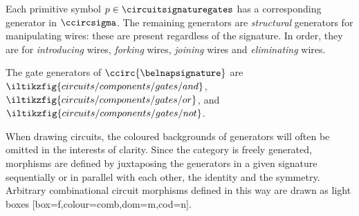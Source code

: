 \documentclass{lmcs}
\begin{document}
Each primitive symbol \(p \in \circuitsignaturegates\) has a corresponding
generator in \(\ccircsigma\).
The remaining generators are \emph{structural} generators
for manipulating
wires: these are present regardless of the signature.
In order, they are for \emph{introducing} wires, \emph{forking}
wires, \emph{joining} wires and \emph{eliminating} wires.

\begin{exa}
    The gate generators of \(\ccirc{\belnapsignature}\) are \(
    \iltikzfig{circuits/components/gates/and}
    \), \(
    \iltikzfig{circuits/components/gates/or}
    \), and \(
    \iltikzfig{circuits/components/gates/not}
    \).
\end{exa}

When drawing circuits, the coloured backgrounds of generators will often be
omitted in the interests of clarity.
Since the category is freely generated, morphisms are defined by
juxtaposing the generators in a given signature sequentially or in parallel with
each other, the identity and the symmetry.
Arbitrary combinational circuit morphisms defined in this way are drawn as light
boxes [box=f,colour=comb,dom=m,cod=n].
\end{document}
